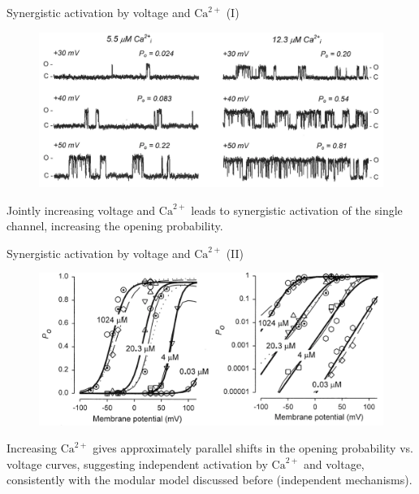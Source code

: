 \documentclass{beamer}
\newcommand{\ca}{\text{Ca}^{2+}}
\begin{document}
\begin{frame}{Synergistic activation by voltage and $\ca$ (I)}
\begin{figure}
\centering
\includegraphics[width=.8\textwidth]{Synergistic_activation_1.png}
\end{figure}
\bigskip
Jointly increasing voltage and $\ca$ leads to synergistic activation of the single channel, increasing the opening probability.
\end{frame}

\begin{frame}{Synergistic activation by voltage and $\ca$ (II)}
\begin{figure}
\centering
\includegraphics[width=.8\textwidth]{Synergistic_activation_2.png}
\end{figure}

Increasing $\ca$ gives approximately parallel shifts in the opening probability vs. voltage curves, suggesting independent activation by $\ca$ and voltage, consistently with the modular model discussed before (independent mechanisms).
\end{frame}
\end{document}
